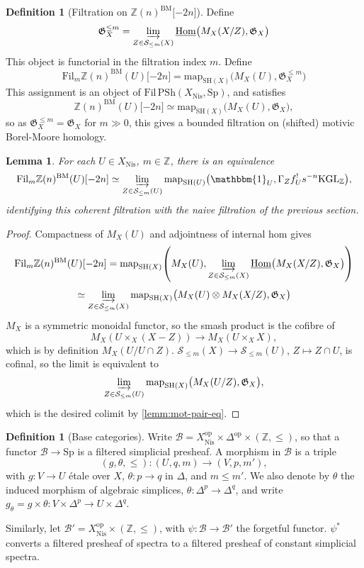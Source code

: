 \documentclass[11pt, twoside]{article}
\numberwithin{equation}{section}
\newtheorem{lemma}[equation]{Lemma}
\theoremstyle{definition}
\newtheorem{definition}[equation]{Definition}
\newcommand{\bb}[1]{\mathbb{#1}}
\newcommand{\Hom}{\mathrm{Hom}}
\newcommand{\colim}{\varinjlim}
\newcommand{\mf}[1]{\mathfrak{#1}}
\newcommand{\map}{\mathrm{map}}
\newcommand{\fil}{\mathrm{Fil}}
\newcommand{\Kgl}{\mathrm{KGL}}
\newcommand{\sh}{\mathrm{SH}}
\newcommand{\Sp}{\mathrm{Sp}}
\newcommand{\bm}{\mathrm{BM}}
\newcommand{\psh}{\mathrm{PSh}}
\newcommand{\nis}{\mathrm{Nis}}
\newcommand{\op}{\mathrm{op}}
\begin{document}
\begin{definition}[Filtration on \(\bb{Z}(n)^\bm \lbrack - 2n \rbrack\)]
Define 
\[\mf{G}_X^{\leq m} = \colim_{Z \in \mathcal{S}_{\leq m}(X)} \underline{\Hom}\big(M_X(X/Z), \mf{G}_X\big)\]
This object is functorial in the filtration index \(m\). Define 
\[\fil_m \bb{Z}(n)^\bm(U)\lbrack -2n \rbrack = \map_{\sh(X)}\big(M_X(U), \mf{G}_X^{\leq m}\big)\]
This assignment is an object of \(\fil \,\psh(X_\nis, \Sp)\), and satisfies 
\[\bb{Z}(n)^\bm(U)\lbrack -2n \rbrack \simeq \map_{\sh(X)}\big(M_X(U), \mf{G}_X\big),\]
so as \(\mf{G}_X^{\leq m} = \mf{G}_X\) for \(m \gg 0\), this gives a bounded filtration on (shifted) motivic Borel-Moore homology.
\end{definition}

\begin{lemma}
For each \(U \in X_\nis\), \(m \in \bb{Z}\), there is an equivalence
\[\fil_m \bb{Z}(n)^\bm(U) \lbrack - 2n \rbrack \simeq \colim_{Z \in \mathcal{S}_{\leq m}(U)} \map_{\sh(U)}\big(\mathbbm{1}_U, \Gamma_Z f_U^! s^{- n} \Kgl_\bb{Z}\big),\]
identifying this coherent filtration with the naive filtration of the previous section.
\end{lemma}

\begin{proof}
Compactness of \(M_X(U)\) and adjointness of internal hom gives 
\[\fil_m \bb{Z}(n)^\bm(U)\lbrack -2n \rbrack = \map_{\sh(X)}\! \left(M_X(U), \colim_{Z \in \mathcal{S}_{\leq m}(X)} \underline{\Hom}\big(M_X(X/Z), \mf{G}_X\big)\right)\]
\[\simeq \colim_{Z \in \mathcal{S}_{\leq m}(X)} \map_{\sh(X)}\big(M_X(U) \otimes M_X(X/Z), \mf{G}_X\big)\]
\(M_X\) is a symmetric monoidal functor, so the smash product is the cofibre of 
\[M_X(U \times_X (X - Z)) \to M_X(U \times_X X),\]
which is by definition \(M_X(U/U \cap Z)\). \(\mathcal{S}_{\leq m}(X) \to \mathcal{S}_{\leq m}(U)\), \(Z \mapsto Z \cap U\), is cofinal, so the limit is equivalent to 
\[\colim_{Z \in \mathcal{S}_{\leq m}(U)} \map_{\sh(X)}\big(M_X(U/Z), \mf{G}_X\big),\]
which is the desired colimit by \ref{lemm:mot-pair-eq}.
\end{proof}

\begin{definition}[Base categories]
Write \(\mathcal{B} = X_\nis^\op \times \Delta^\op \times (\bb{Z}, \leq)\), so that a functor \(\mathcal{B} \to \Sp\) is a filtered simplicial presheaf. A morphism in \(\mathcal{B}\) is a triple 
\[(g, \theta, \leq) \colon (U, q, m) \to (V, p, m'),\]
with \(g \colon V \to U\) étale over \(X\), \(\theta \colon p \to q\) in \(\Delta\), and \(m \leq m'\). We also denote by \(\theta\) the induced morphism of algebraic simplices, \(\theta \colon \Delta^p \to \Delta^q\), and write \(g_\theta = g \times \theta \colon V \times \Delta^p \to U \times \Delta^q\).

Similarly, let \(\mathcal{B}' = X_\nis^\op \times (\bb{Z}, \leq)\), with \(\psi \colon \mathcal{B} \to \mathcal{B}'\) the forgetful functor. \(\psi^*\) converts a filtered presheaf of spectra to a filtered presheaf of constant simplicial spectra.
\end{definition}
\end{document}
